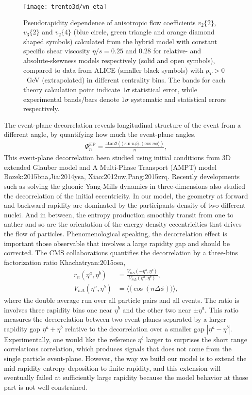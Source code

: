 \begin{figure}
\texttt{[image: trento3d/vn\_eta]}
\caption{Pseudorapidity dependence of anisotropic flow coefficients $v_2\{2\}$, $v_3\{2\}$ and $v_2\{4\}$ (blue circle, green triangle and orange diamond shaped symbols) calculated from the hybrid model with constant specific shear viscosity $\eta/s=0.25$ and $0.28$ for relative- and absolute-skewness models respectively (solid and open symbols), compared to data from ALICE (smaller black symbols) with $p_T > 0$~GeV (extrapolated) in different centrality bins. 
The bands for each theory calculation point indicate $1\sigma$ statistical error, while experimental bands/bars denote $1\sigma$ systematic and statistical errors respectively.}
\label{fig:trento:vn_eta}
\end{figure}

The event-plane decorrelation reveals longitudinal structure of the event from a different angle, by quantifying how much the event-plane angles,
\begin{eqnarray}
\Psi_n^\text{EP} = \frac{\text{atan2}(\langle \sin n \phi \rangle, \langle\cos n \phi \rangle)}{n},
\end{eqnarray}
This event-plane decorrelation been studied using initial conditions from 3D extended Glauber model and A Multi-Phase Transport (AMPT) model {Bozek:2015bna,Jia:2014ysa, Xiao:2012uw,Pang:2015zrq}.
Recently developments such as solving the gluonic Yang-Mills dynamics in three-dimensions also studied the decorrelation of the initial eccentricity.
In our model, the geometry at forward and backward rapidity are dominated by the participants density of two different nuclei.
And in between, the entropy production smoothly transit from one to anther and so are the orientation of the energy density eccentricities that drives the flow of particles.
Phenomenological speaking, the decorrelation effect is important those observable that involves a large rapidity gap and should be corrected.
The CMS collaborations quantifies the decorrelation by a three-bins factorization ratio {Khachatryan:2015oea},
\begin{eqnarray}
r_n(\eta^a, \eta^b) &= \frac{V_{n\Delta}(-\eta^a, \eta^b)}{V_{n\Delta}(\eta^a, \eta^b)}, \\
V_{n\Delta}(\eta^a, \eta^b) &= \langle\langle \cos(n\Delta\phi) \rangle\rangle,
\end{eqnarray}
where the double average run over all particle pairs and all events.
The ratio is involves three rapidity bins one near $\eta^b$ and the other two near $\pm\eta^a$.
This ratio measures the decorrelation between two event planes separated by a larger rapidity gap $\eta^a + \eta^b$ relative to the decorrelation over a smaller gap $|\eta^a - \eta^b|$.
Experimentally, one would like the reference $\eta^b$ larger to surprises the short range correlations correlation, which produces signals that does not come from the single particle event-plane.
However, the way we build our model is to extend the mid-rapidity entropy deposition to finite rapidity, and this extension will eventually failed at sufficiently large rapidity because the model behavior at those part is not well constrained.

